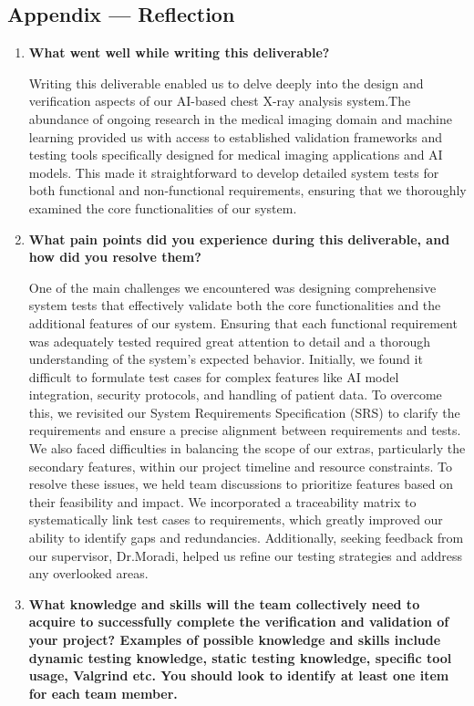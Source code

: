 \documentclass[12pt, titlepage]{article}
\begin{document}
\begin{enumerate}
\begin{enumerate}
\begin{enumerate}
\begin{enumerate}
\newpage{}
\section*{Appendix --- Reflection}
\begin{enumerate}
  \item \textbf{What went well while writing this deliverable?}
  
  Writing this deliverable enabled us to delve deeply into the design and verification aspects of our AI-based chest X-ray analysis system.The abundance of ongoing research in the medical imaging domain and machine learning provided us with access to established validation frameworks and testing tools specifically designed for medical imaging applications and AI models. This made it straightforward to develop detailed system tests for both functional and non-functional requirements, ensuring that we thoroughly examined the core functionalities of our system.
  \item \textbf{What pain points did you experience during this deliverable, and how
    did you resolve them?}
    
  One of the main challenges we encountered was designing comprehensive system tests that effectively validate both the core functionalities and the additional features of our system. Ensuring that each functional requirement was adequately tested required great attention to detail and a thorough understanding of the system's expected behavior. Initially, we found it difficult to formulate test cases for complex features like AI model integration, security protocols, and handling of patient data. To overcome this, we revisited our System Requirements Specification (SRS) to clarify the requirements and ensure a precise alignment between requirements and tests. We also faced difficulties in balancing the scope of our extras, particularly the secondary features, within our project timeline and resource constraints. To resolve these issues, we held team discussions to prioritize features based on their feasibility and impact. We incorporated a traceability matrix to systematically link test cases to requirements, which greatly improved our ability to identify gaps and redundancies. Additionally, seeking feedback from our supervisor, Dr.Moradi, helped us refine our testing strategies and address any overlooked areas. 
  \item \textbf{What knowledge and skills will the team collectively need to acquire to
  successfully complete the verification and validation of your project?
  Examples of possible knowledge and skills include dynamic testing knowledge,
  static testing knowledge, specific tool usage, Valgrind etc.  You should look to
  identify at least one item for each team member.}


\end{enumerate}
\end{enumerate}
\end{enumerate}
\end{enumerate}
\end{enumerate}
\end{document}
